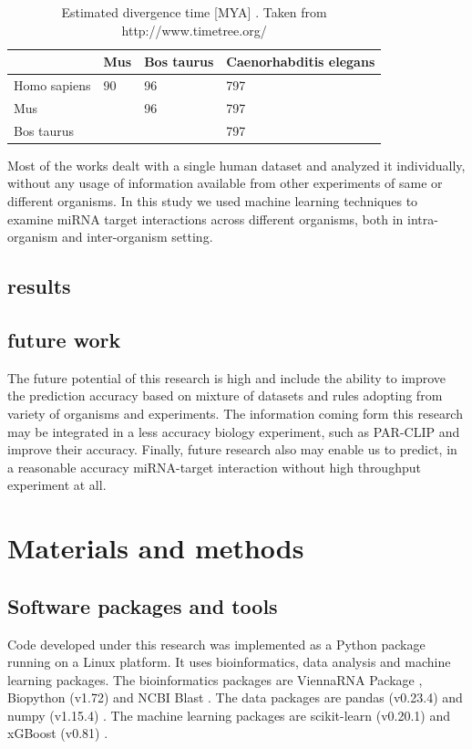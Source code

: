 \documentclass{bmcart}
\begin{document}
\begin{table}[h!]
\caption{Estimated divergence time {[}MYA{]} . Taken from http://www.timetree.org/}
\label{tab:evolutiontime}
\begin{tabular}{|l|l|l|l|}
\hline
             & Mus & Bos taurus & Caenorhabditis elegans \\ \hline
Homo sapiens & 90  & 96         & 797                    \\ \hline
Mus          &     & 96         & 797                    \\ \hline
Bos taurus   &     &            & 797                    \\ \hline
\end{tabular}
\end{table}



Most of the works dealt with a single human dataset and analyzed it individually, without any usage of information available from other experiments of same or different organisms. In this study we used machine learning techniques to examine miRNA target interactions across different organisms, both in intra-organism and inter-organism setting.

\subsection{results}

\subsection{future work}
The future potential of this research is high and include the ability to improve the prediction accuracy based on mixture of datasets and rules adopting from variety of organisms and experiments. The information coming form this research may be integrated in a less accuracy biology experiment, such as PAR-CLIP and improve their accuracy. Finally, future research also may enable us to predict, in a reasonable accuracy miRNA-target interaction without high throughput experiment at all.




\section*{Materials and methods}
\subsection*{Software packages and tools}
Code developed under this research was implemented as a Python package running on a Linux platform. It uses bioinformatics, data analysis and machine learning packages. The bioinformatics packages are ViennaRNA Package \cite{lorenz2011viennarna}, Biopython (v1.72) \cite{cock2009biopython} and NCBI Blast \cite{altschul1990basic_blast}. The data packages are pandas (v0.23.4) \cite{mckinney2010data_pandas} and numpy (v1.15.4) \cite{oliphant2006guide_numpy}. The machine learning packages are scikit-learn (v0.20.1) \cite{pedregosa2011scikit} and xGBoost (v0.81) \cite{xgboost}.
\end{document}
